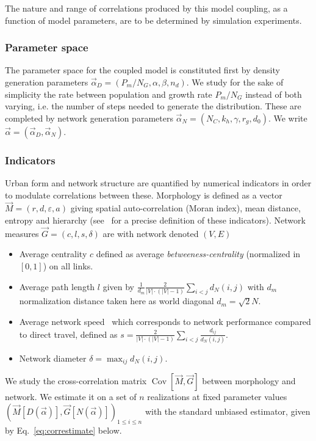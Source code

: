 \documentclass{bmcart}
\DeclareMathOperator{\Cov}{Cov}
\newcommand{\Covb}[2]{\ensuremath{\Cov\!\left[#1,#2\right]}}
\begin{document}
The nature and range of correlations produced by this model coupling, as a function of model parameters, are to be determined by simulation experiments.


\subsubsection*{Parameter space}

The parameter space for the coupled model is constituted first by density generation parameters $\vec{\alpha}_D = (P_m/N_G , \alpha,\beta , n_d)$. We study for the sake of simplicity the rate between population and growth rate $P_m/N_G$ instead of both varying, i.e. the number of steps needed to generate the distribution. These are completed by network generation parameters $\vec{\alpha}_N=(N_C,k_h,\gamma , r_g , d_0)$. We write $\vec{\alpha} = (\vec{\alpha}_D,\vec{\alpha}_N)$.


\subsubsection*{Indicators}

Urban form and network structure are quantified by numerical indicators in order to modulate correlations between these. Morphology is defined as a vector $\vec{M}=(r,d,\varepsilon,a)$ giving spatial auto-correlation (Moran index), mean distance, entropy and hierarchy (see~\cite{le2015forme} for a precise definition of these indicators). Network measures $\vec{G} = (c,l,s,\delta)$ are with network denoted $(V,E)$
\begin{itemize}
\item Average centrality $c$ defined as average \emph{betweeness-centrality} (normalized in $[0,1]$) on all links.
\item Average path length $l$ given by $\frac{1}{d_m}\frac{2}{|V|\cdot (|V|-1)}\sum_{i<j}d_N(i,j)$ with $d_m$ normalization distance taken here as world diagonal $d_m=\sqrt{2}N$.
\item Average network speed~\cite{banos2012towards} which corresponds to network performance compared to direct travel, defined as $s = \frac{2}{|V|\cdot (|V|-1)}\sum_{i<j}{\frac{d_{ij}}{d_N(i,j)}}$.
\item Network diameter $\delta = \max_{ij}d_N(i,j)$.
\end{itemize}



We study the cross-correlation matrix $\Covb{\vec{M}}{\vec{G}}$ between morphology and network. We estimate it on a set of $n$ realizations at fixed parameter values $(\vec{M}\left[D(\vec{\alpha})\right],\vec{G}\left[N(\vec{\alpha})\right])_{1\leq i\leq n}$ with the standard unbiased estimator, given by Eq.~\ref{eq:correstimate} below.
\end{document}
